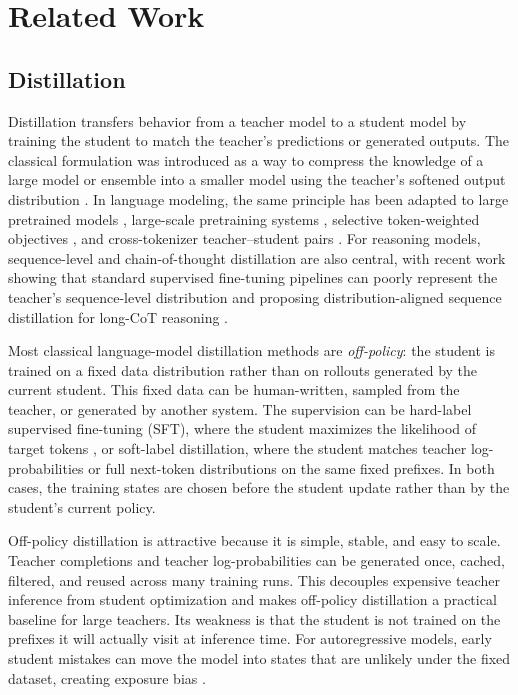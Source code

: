 \chapter{Related Work}
\label{sec:related-work}

\section{Distillation}

Distillation transfers behavior from a teacher model to a student model by training the student to match the teacher's predictions or generated outputs. The classical formulation was introduced as a way to compress the knowledge of a large model or ensemble into a smaller model using the teacher's softened output distribution \cite{hintonDistillingKnowledgeNeural2015}. In language modeling, the same principle has been adapted to large pretrained models \cite{tan2023GKDGeneralKnowledge}, large-scale pretraining systems \cite{wang2021ERNIE30Titan}, selective token-weighted objectives \cite{huang2025SelecTKDSelectiveTokenWeighted}, and cross-tokenizer teacher--student pairs \cite{boizardCrossTokenizerDistillationUniversal2025,minixhoferUniversalCrossTokenizerDistillation2025}. For reasoning models, sequence-level and chain-of-thought distillation are also central, with recent work showing that standard supervised fine-tuning pipelines can poorly represent the teacher's sequence-level distribution and proposing distribution-aligned sequence distillation for long-CoT reasoning \cite{yanDistributionAlignedSequenceDistillation2026}.

Most classical language-model distillation methods are \emph{off-policy}: the student is trained on a fixed data distribution rather than on rollouts generated by the current student. This fixed data can be human-written, sampled from the teacher, or generated by another system. The supervision can be hard-label supervised fine-tuning (SFT), where the student maximizes the likelihood of target tokens \cite{zotero-item-425}, or soft-label distillation, where the student matches teacher log-probabilities or full next-token distributions on the same fixed prefixes. In both cases, the training states are chosen before the student update rather than by the student's current policy.

Off-policy distillation is attractive because it is simple, stable, and easy to scale. Teacher completions and teacher log-probabilities can be generated once, cached, filtered, and reused across many training runs. This decouples expensive teacher inference from student optimization and makes off-policy distillation a practical baseline for large teachers. Its weakness is that the student is not trained on the prefixes it will actually visit at inference time. For autoregressive models, early student mistakes can move the model into states that are unlikely under the fixed dataset, creating exposure bias \cite{pmlr-v9-ross10a}.

